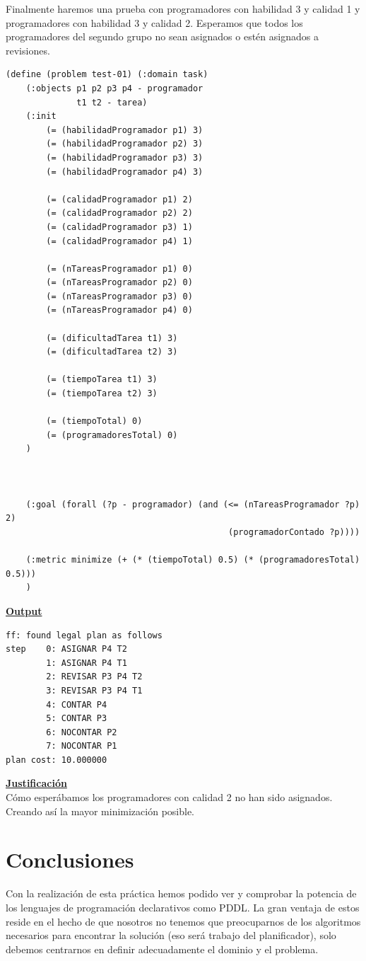 \documentclass[11pt]{article}
\begin{document}
Finalmente haremos una prueba con programadores con habilidad 3 y calidad 1 y programadores con habilidad 3 y calidad 2. Esperamos que todos los programadores del segundo grupo no sean asignados o estén asignados a revisiones.
\medskip
\begin{verbatim}
(define (problem test-01) (:domain task)
    (:objects p1 p2 p3 p4 - programador
			  t1 t2 - tarea)
    (:init
        (= (habilidadProgramador p1) 3)
        (= (habilidadProgramador p2) 3)
        (= (habilidadProgramador p3) 3)
        (= (habilidadProgramador p4) 3)
        
        (= (calidadProgramador p1) 2)
        (= (calidadProgramador p2) 2)
        (= (calidadProgramador p3) 1)
        (= (calidadProgramador p4) 1)
        
        (= (nTareasProgramador p1) 0)
        (= (nTareasProgramador p2) 0)
        (= (nTareasProgramador p3) 0)
        (= (nTareasProgramador p4) 0)
        
        (= (dificultadTarea t1) 3)
        (= (dificultadTarea t2) 3)
        
        (= (tiempoTarea t1) 3)
        (= (tiempoTarea t2) 3)
        
        (= (tiempoTotal) 0)
        (= (programadoresTotal) 0)
    )

    

    (:goal (forall (?p - programador) (and (<= (nTareasProgramador ?p) 2)
											(programadorContado ?p))))
    
    (:metric minimize (+ (* (tiempoTotal) 0.5) (* (programadoresTotal) 0.5)))
    )
\end{verbatim}

\noindent \underline{\textbf{Output}}
\medskip
\begin{verbatim}
ff: found legal plan as follows
step    0: ASIGNAR P4 T2
        1: ASIGNAR P4 T1
        2: REVISAR P3 P4 T2
        3: REVISAR P3 P4 T1
        4: CONTAR P4
        5: CONTAR P3
        6: NOCONTAR P2
        7: NOCONTAR P1
plan cost: 10.000000
\end{verbatim}
\noindent \underline{\textbf{Justificación}} \\

Cómo esperábamos los programadores con calidad 2 no han sido asignados. Creando así la mayor minimización posible.
\medskip

\newpage
\section{Conclusiones}
Con la realización de esta práctica hemos podido ver y comprobar la potencia de los lenguajes de programación declarativos como PDDL. La gran ventaja de estos reside en el hecho de que nosotros no tenemos que preocuparnos de los algoritmos necesarios para encontrar la solución (eso será trabajo del planificador), solo debemos centrarnos en definir adecuadamente el dominio y el problema. 
\end{document}
